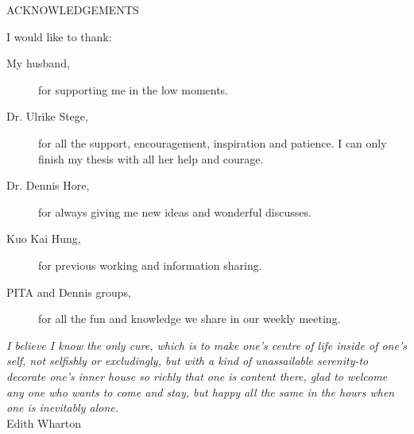 \newpage
{}

\begin{center}
ACKNOWLEDGEMENTS
\end{center}

\noindent I would like to thank:
\begin{description}
\item[My husband,]
	for supporting me in the low moments.
\item[Dr. Ulrike Stege,]
	for  all the support, encouragement, inspiration and patience. I can only finish my thesis with all her help and courage.
\item[Dr. Dennis Hore,]
	for always giving me new ideas and wonderful discusses.
\item[Kuo Kai Hung, ]
	for previous working and information sharing.
\item[PITA and Dennis groups,]
	for all the fun and knowledge we share in our weekly meeting.
\end{description}

\begin{flushright}
\textit{I believe I know the only cure, which is to make
one's centre of life inside of one's self, not
selfishly or excludingly, but with a kind of
unassailable serenity-to decorate one's inner house
so richly that one is content there, glad to welcome
any one who wants to come and stay, but happy all
the same in the hours when one is inevitably alone.}
\\
Edith Wharton \\
\end{flushright}
